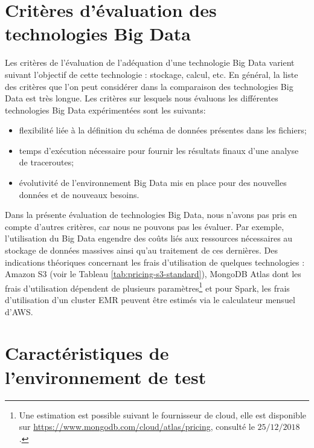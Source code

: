 
\section{Critères d'évaluation des technologies  Big Data}
Les critères de l'évaluation de l'adéquation d'une technologie Big Data  varient  suivant  l'objectif de cette technologie : stockage, calcul, etc.  En général, la liste des critères que l'on peut considérer dans la comparaison des technologies Big Data est très longue.  Les critères sur lesquels nous  évaluons  les différentes technologies  Big Data expérimentées sont les suivants:
\begin{itemize}
	\item flexibilité liée à la définition du  schéma de  données présentes dans les fichiers;
	\item temps d'exécution nécessaire pour fournir les résultats finaux d'une analyse de traceroutes;
	\item évolutivité de l'environnement Big Data mis en place pour des nouvelles données et de nouveaux besoins.
\end{itemize}

Dans la présente évaluation de  technologies Big Data, nous n'avons pas pris en compte d'autres critères, car nous ne pouvons pas les évaluer. Par exemple, l'utilisation du  Big Data engendre des coûts  liés aux ressources nécessaires au stockage de données massives ainsi qu'au traitement de ces dernières. Des indications théoriques concernant les frais d'utilisation de quelques technologies 
 : Amazon S3 (voir le Tableau \ref{tab:pricing-s3-standard}),  MongoDB Atlas dont les frais d'utilisation  dépendent de plusieurs paramètres\footnote{Une estimation est possible suivant le fournisseur de cloud, elle est disponible  sur \url{https://www.mongodb.com/cloud/atlas/pricing}, consulté le $25/12/2018$.} et pour Spark, les frais d'utilisation d'un cluster EMR peuvent être estimés via le  calculateur mensuel d'AWS. 

\section{Caractéristiques de l'environnement de test} \label{machine-openvz-caracteritics}

